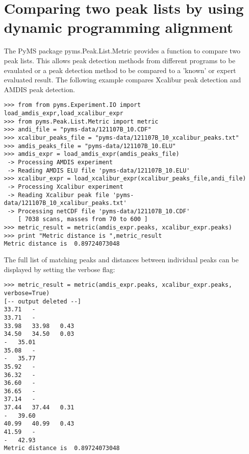 \section{Comparing two peak lists by using dynamic programming alignment}


The PyMS package pyms.Peak.List.Metric provides a function to compare two peak lists.
This allows peak detection methods from different programs to be evaulated or a peak
detection method to be compared to a 'known' or expert evaluated result. The following
example compares Xcalibur peak detection and AMDIS peak detection.

\begin{verbatim}
>>> from from pyms.Experiment.IO import load_amdis_expr,load_xcalibur_expr
>>> from pyms.Peak.List.Metric import metric
>>> andi_file = "pyms-data/121107B_10.CDF"
>>> xcalibur_peaks_file = "pyms-data/121107B_10_xcalibur_peaks.txt"
>>> amdis_peaks_file = "pyms-data/121107B_10.ELU"
>>> amdis_expr = load_amdis_expr(amdis_peaks_file)
 -> Processing AMDIS experiment
 -> Reading AMDIS ELU file 'pyms-data/121107B_10.ELU'
>>> xcalibur_expr = load_xcalibur_expr(xcalibur_peaks_file,andi_file)
 -> Processing Xcalibur experiment
 -> Reading Xcalibur peak file 'pyms-data/121107B_10_xcalibur_peaks.txt'
 -> Processing netCDF file 'pyms-data/121107B_10.CDF'
    [ 7038 scans, masses from 70 to 600 ]
>>> metric_result = metric(amdis_expr.peaks, xcalibur_expr.peaks)
>>> print "Metric distance is ",metric_result
Metric distance is  0.89724073048
\end{verbatim}

The full list of matching peaks and distances between individual peaks can be displayed
by setting the verbose flag:

\begin{verbatim}
>>> metric_result = metric(amdis_expr.peaks, xcalibur_expr.peaks, verbose=True)
[-- output deleted --]
33.71	-
33.71	-
33.98	33.98	0.43
34.50	34.50	0.03
-	35.01
35.08	-
-	35.77
35.92	-
36.32	-
36.60	-
36.65	-
37.14	-
37.44	37.44	0.31
-	39.60
40.99	40.99	0.43
41.59	-
-	42.93
Metric distance is  0.89724073048
\end{verbatim}
